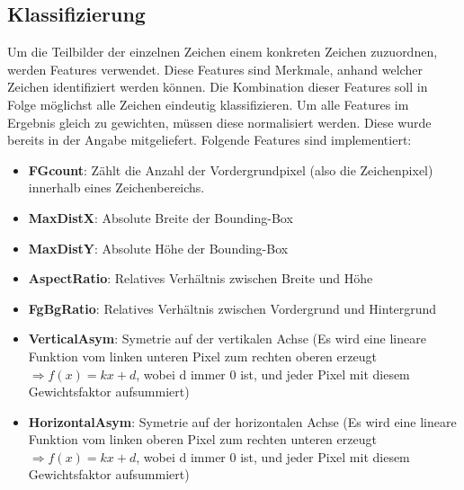 \subsection{Klassifizierung}
Um die Teilbilder der einzelnen Zeichen einem konkreten Zeichen zuzuordnen, werden Features verwendet. Diese Features sind Merkmale, anhand welcher Zeichen 
identifiziert werden können. Die Kombination dieser Features soll in Folge möglichst alle Zeichen eindeutig klassifizieren. Um alle Features im Ergebnis
gleich zu gewichten, müssen diese normalisiert werden. Diese wurde bereits in der Angabe mitgeliefert. Folgende Features sind implementiert:
\begin{itemize}
    \item \textbf{FGcount}: Zählt die Anzahl der Vordergrundpixel (also die Zeichenpixel) innerhalb eines Zeichenbereichs.
    \item \textbf{MaxDistX}: Absolute Breite der Bounding-Box
    \item \textbf{MaxDistY}: Absolute Höhe der Bounding-Box
    \item \textbf{AspectRatio}: Relatives Verhältnis zwischen Breite und Höhe
    \item \textbf{FgBgRatio}: Relatives Verhältnis zwischen Vordergrund und Hintergrund
    \item \textbf{VerticalAsym}: Symetrie auf der vertikalen Achse (Es wird eine lineare Funktion vom linken unteren Pixel zum rechten oberen erzeugt $\Rightarrow f(x) = kx + d$, wobei d immer 0 ist, und jeder Pixel mit diesem Gewichtsfaktor aufsummiert)
    \item \textbf{HorizontalAsym}: Symetrie auf der horizontalen Achse (Es wird eine lineare Funktion vom linken oberen Pixel zum rechten unteren erzeugt $\Rightarrow f(x) = kx + d$, wobei d immer 0 ist, und jeder Pixel mit diesem Gewichtsfaktor aufsummiert)
\end{itemize}
